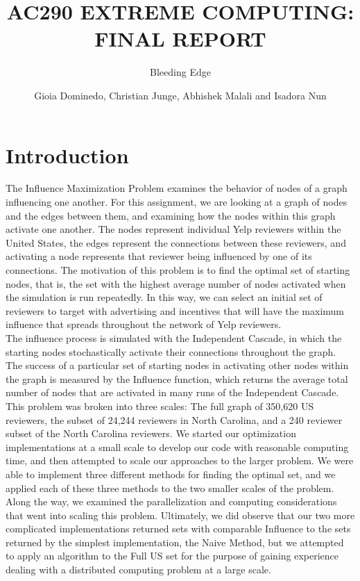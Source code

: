 \documentclass[11pt]{scrartcl} %
\title{AC290 EXTREME COMPUTING: FINAL REPORT}
\subtitle{Bleeding Edge}
\author{Gioia Dominedo, Christian Junge, Abhishek Malali and Isadora Nun}
\begin{document}
\setcounter{secnumdepth}{0}
\maketitle
\setlength{\parindent}{5ex}

\section{Introduction}

The Influence Maximization Problem examines the behavior of nodes of a graph influencing one another.  For this assignment, we are looking at a graph of nodes and the edges between them, and examining how the nodes within this graph activate one another.  The nodes represent individual Yelp reviewers within the United States, the edges represent the connections between these reviewers, and activating a node represents that reviewer being influenced by one of its connections.  The motivation of this problem is to find the optimal set of starting nodes, that is, the set with the highest average number of nodes activated when the simulation is run repeatedly.  In this way, we can select an initial set of reviewers to target with advertising and incentives that will have the maximum influence that spreads throughout the network of Yelp reviewers.  \\

The influence process is simulated with the Independent Cascade, in which the starting nodes stochastically activate their connections throughout the graph.  The success of a particular set of starting nodes in activating other nodes within the graph is measured by the Influence function, which returns the average total number of nodes that are activated in many runs of the Independent Cascade.  \\

This problem was broken into three scales: The full graph of 350,620 US reviewers, the subset of 24,244 reviewers in North Carolina, and a 240 reviewer subset of the North Carolina reviewers.  We started our optimization implementations at a small scale to develop our code with reasonable computing time, and then attempted to scale our approaches to the larger problem.  We were able to implement three different methods for finding the optimal set, and we applied each of these three methods to the two smaller scales of the problem.  Along the way, we examined the parallelization and computing considerations that went into scaling this problem.  Ultimately, we did observe that our two more complicated implementations returned sets with comparable Influence to the sets returned by the simplest implementation, the Naive Method, but we attempted to apply an algorithm to the Full US set for the purpose of gaining experience dealing with a distributed computing problem at a large scale.  \\
\end{document}
